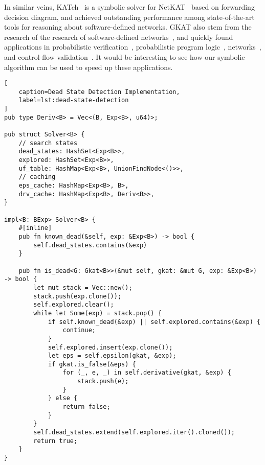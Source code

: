 \documentclass[conference]{IEEEtran}
\begin{document}
In similar veins, KATch~\cite{moeller_KATchFastSymbolic_2024} is a symbolic solver for NetKAT~\cite{anderson_NetKATSemanticFoundations_2014} based on forwarding decision diagram, and achieved outstanding performance among state-of-the-art tools for reasoning about software-defined networks.
GKAT also stem from the research of the research of software-defined networks~\cite{smolka_ScalableVerificationProbabilistic_2019,smolka_GuardedKleeneAlgebra_2020}, and quickly found applications in probabilistic verification~\cite{ro.zowski_ProbabilisticGuardedKAT_2023}, probabilistic program logic~\cite{gomes_KleeneAlgebraTests_2024}, networks~\cite{wasserstein_GUARDEDNETKATSOUNDNESS_2023}, and control-flow validation~\cite{zhang_CFGKATEfficientValidation_2025}.
It would be interesting to see how our symbolic algorithm can be used to speed up these applications.

\printbibliography

\clearpage
\appendix

\begin{onecolumn}
\begin{lstlisting}[
    caption=Dead State Detection Implementation,
    label=lst:dead-state-detection
]
pub type Deriv<B> = Vec<(B, Exp<B>, u64)>;

pub struct Solver<B> {
    // search states
    dead_states: HashSet<Exp<B>>,
    explored: HashSet<Exp<B>>,
    uf_table: HashMap<Exp<B>, UnionFindNode<()>>,
    // caching
    eps_cache: HashMap<Exp<B>, B>,
    drv_cache: HashMap<Exp<B>, Deriv<B>>,
}

impl<B: BExp> Solver<B> {
    #[inline]
    pub fn known_dead(&self, exp: &Exp<B>) -> bool {
        self.dead_states.contains(&exp)
    }

    pub fn is_dead<G: Gkat<B>>(&mut self, gkat: &mut G, exp: &Exp<B>) -> bool {
        let mut stack = Vec::new();
        stack.push(exp.clone());
        self.explored.clear();
        while let Some(exp) = stack.pop() {
            if self.known_dead(&exp) || self.explored.contains(&exp) {
                continue;
            }
            self.explored.insert(exp.clone());
            let eps = self.epsilon(gkat, &exp);
            if gkat.is_false(&eps) {
                for (_, e, _) in self.derivative(gkat, &exp) {
                    stack.push(e);
                }
            } else {
                return false;
            }
        }
        self.dead_states.extend(self.explored.iter().cloned());
        return true;
    }
}
\end{lstlisting}
\end{onecolumn}
\end{document}
